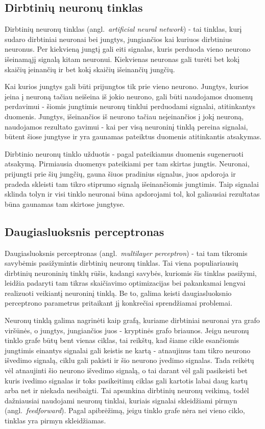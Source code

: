 \documentclass{VUMIFPSbakalaurinis}
\begin{document}
\subsection{Dirbtinių neuronų tinklas}

Dirbtinių neuronų tinklas (angl.~\textit{artificial neural network}) - tai tinklas, kurį sudaro dirbtiniai neuronai bei jungtys, jungiančios kai kuriuos dirbtinius neuronus.
Per kiekvieną jungtį gali eiti signalas, kuris perduoda vieno neurono išeinamąjį signalą kitam neuronui.
Kiekvienas neuronas gali turėti bet kokį skaičių įeinančių ir bet kokį skaičių išeinančių jungčių.

Kai kurios jungtys gali būti prijungtos tik prie vieno neurono.
Jungtys, kurios įeina į neuroną tačiau neišeina iš jokio neurono, gali būti naudojamos duomenų perdavimui - šiomis jungtimis neuronų tinklui perduodami signalai, atitinkantys duomenis.
Jungtys, išeinančios iš neurono tačiau neįeinančios į jokį neuroną, naudojamos rezultato gavimui - kai per visą neuroninį tinklą pereina signalai, būtent šiose jungtyse ir yra gaunamas pateiktus duomenis atitinkantis atsakymas.

Dirbtinio neuronų tinklo užduotis - pagal pateikiamus duomenis sugeneruoti atsakymą.
Pirmiausia duomenys pateikiami per tam skirtas jungtis.
Neuronai, prijungti prie šių jungčių, gauna šiuos pradinius signalus, juos apdoroja ir pradeda skleisti tam tikro stiprumo signalą išeinančiomis jungtimis.
Taip signalai sklinda tolyn ir visi tinklo neuronai būna apdorojami tol, kol galiausiai rezultatas būna gaunamas tam skirtose jungtyse.



\subsection{Daugiasluoksnis perceptronas}

Daugiasluoksnis perceptronas (angl.~\textit{multilayer perceptron}) - tai tam tikromis savybėmis pasižymintis dirbtinių neuronų tinklas.
Tai viena populiariausių dirbtinių neuroninių tinklų rūšis, kadangi savybės, kuriomis šis tinklas pasižymi, leidžia padaryti tam tikras skaičiavimo optimizacijas bei pakankamai lengvai realizuoti veikiantį neuroninį tinklą.
Be to, galima keisti daugiasluoksnio perceptrono parametrus pritaikant jį konkrečiai sprendžiamai problemai.

Neuronų tinklą galima nagrinėti kaip grafą, kuriame dirbtiniai neuronai yra grafo viršūnės, o jungtys, jungiančios juos - kryptinės grafo briaunos.
Jeigu neuronų tinklo grafe būtų bent vienas ciklas, tai reikštų, kad šiame cikle esančiomis jungtimis einantys signalai gali keistis ne kartą - atnaujinus tam tikro neurono išvedimo signalą, ciklu gali pakisti ir šio neurono įvedimo signalas.
Tada reikėtų vėl atnaujinti šio neurono išvedimo signalą, o tai darant vėl gali pasikeisti bet kuris ivedimo signalas ir toks pasikeitimų ciklas gali kartotis labai daug kartų arba net ir niekada nesibaigti.
Tai apsunkina dirbtinių neuronų veikimą, todėl dažniausiai naudojami neuronų tinklai, kuriais signalai skleidžiami pirmyn (angl.~\textit{feedforward}).
Pagal apibrėžimą, jeigu tinklo grafe nėra nei vieno ciklo, tinklas yra pirmyn skleidžiamas.
\end{document}
